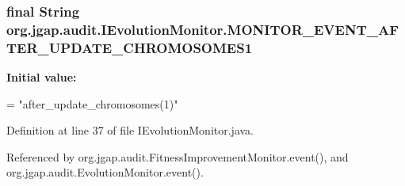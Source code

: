 \hypertarget{interfaceorg_1_1jgap_1_1audit_1_1_i_evolution_monitor_ab3c2b0d2ba80028cf13d9fc7997c1873}{
\subsubsection[{M\-O\-N\-I\-T\-O\-R\-\_\-\-E\-V\-E\-N\-T\-\_\-\-A\-F\-T\-E\-R\-\_\-\-U\-P\-D\-A\-T\-E\-\_\-\-C\-H\-R\-O\-M\-O\-S\-O\-M\-E\-S1}]{\setlength{\rightskip}{0pt plus 5cm}final String org.\-jgap.\-audit.\-I\-Evolution\-Monitor.\-M\-O\-N\-I\-T\-O\-R\-\_\-\-E\-V\-E\-N\-T\-\_\-\-A\-F\-T\-E\-R\-\_\-\-U\-P\-D\-A\-T\-E\-\_\-\-C\-H\-R\-O\-M\-O\-S\-O\-M\-E\-S1\hspace{0.3cm}{\ttfamily [static]}}}\label{interfaceorg_1_1jgap_1_1audit_1_1_i_evolution_monitor_ab3c2b0d2ba80028cf13d9fc7997c1873}
{\bfseries Initial value\-:}
\begin{DoxyCode}
=
      \textcolor{stringliteral}{"after\_update\_chromosomes(1)"}
\end{DoxyCode}


Definition at line 37 of file I\-Evolution\-Monitor.\-java.



Referenced by org.\-jgap.\-audit.\-Fitness\-Improvement\-Monitor.\-event(), and org.\-jgap.\-audit.\-Evolution\-Monitor.\-event().

